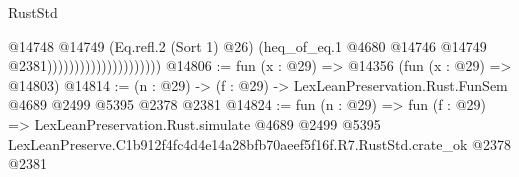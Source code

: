 \begin{lexlean}{RustStd}
\begin{coremodule}
                                          @14748
                                            @14749
                                            (Eq.refl.{2} (Sort 1) @26)
                                            (heq_of_eq.{1}
                                              @4680
                                              @14746
                                              @14749
                                              @2381)))))))))))))))))))))
@14806 := fun (x : @29) => @14356 (fun (x : @29) => @14803)
@14814 := (n : @29) -> (f : @29) -> LexLeanPreservation.Rust.FunSem @4689 @2499 @5395 @2378 @2381
@14824 := fun (n : @29) =>
  fun (f : @29) =>
  LexLeanPreservation.Rust.simulate
    @4689
    @2499
    @5395
    LexLeanPreserve.C1b912f4fc4d4e14a28bfb70aeef5f16f.R7.RustStd.crate_ok
    @2378
    @2381
\end{coremodule}
\end{lexlean}
